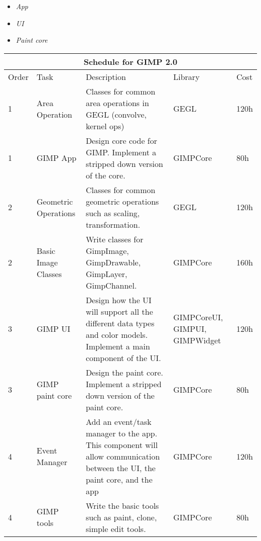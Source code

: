 
\begin{itemize}
\item {\em App}
\item {\em UI}
\item {\em Paint core}
\end{itemize}
\begin{flushleft}		
\begin{tabular}{|l|p{3cm}|p{5cm}|p{2cm}|l|}\hline
\multicolumn{5}{|c|}{\rule[-3mm]{0mm}{8mm} \large \bf Schedule for GIMP 2.0}\\  
\hline
Order & Task & Description & Library & Cost\\ \hline 

1 & Area Operation & Classes for common area operations in GEGL (convolve, kernel ops) & GEGL & 120h\\
\hline
1 & GIMP App & Design core code for GIMP. Implement a stripped down version of the core. & GIMPCore & 80h\\
\hline
2 & Geometric Operations & Classes for common geometric operations such as scaling, transformation. & GEGL & 120h\\
\hline
2 & Basic Image Classes & Write classes for GimpImage, GimpDrawable, GimpLayer, GimpChannel. & GIMPCore & 160h\\
\hline 
3 & GIMP UI & Design how the UI will support all the different data types and color models. Implement a main component 
of the UI. & GIMPCoreUI, GIMPUI, GIMPWidget & 120h\\
\hline 
3 & GIMP paint core & Design the paint core. Implement a stripped down version of the paint core. & GIMPCore & 80h\\
\hline
4 & Event Manager & Add an event/task manager to the app. This component will allow communication between the UI, the paint core, and the app & GIMPCore & 120h\\
\hline 
4 & GIMP tools & Write the basic tools such as paint, clone, simple edit tools. & GIMPCore & 80h\\
\hline


\end{tabular}
\end{flushleft}
